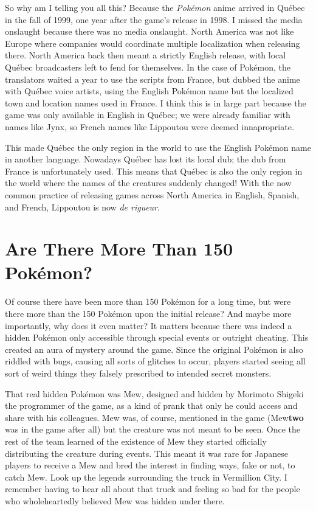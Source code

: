 \documentclass{book}
\begin{document}
So why am I telling you all this? Because the \emph{Pokémon} anime arrived in Québec in the fall of 1999, one year after the game’s release in 1998. I missed the media onslaught because there was no media onslaught. North America was not like Europe where companies would coordinate multiple localization when releasing there. North America back then meant a strictly English release, with local Québec broadcasters left to fend for themselves. In the case of Pokémon, the translators waited a year to use the scripts from France, but dubbed the anime with Québec voice artists, using the English Pokémon name but the localized town and location names used in France. I think this is in large part because the game was only available in English in Québec; we were already familiar with names like Jynx, so French names like Lippoutou were deemed innapropriate.

This made Québec the only region in the world to use the English Pokémon name in another language. Nowadays Québec has lost its local dub; the dub from France is unfortunately used. This means that Québec is also the only region in the world where the names of the creatures suddenly changed! With the now common practice of releasing games across North America in English, Spanish, and French, Lippoutou is now \emph{de rigueur}.

\FloatBarrier\needspace{10mm}\section*{Are There More Than 150 Pokémon?}\nopagebreak[4]

Of course there have been more than 150 Pokémon for a long time, but were there more than the 150 Pokémon upon the initial release? And maybe more importantly, why does it even matter? It matters because there was indeed a hidden Pokémon only accessible through special events or outright cheating. This created an aura of mystery around the game. Since the original Pokémon is also riddled with bugs, causing all sorts of glitches to occur, players started seeing all sort of weird things they falsely prescribed to intended secret monsters.

That real hidden Pokémon was Mew, designed and hidden by Morimoto Shigeki the programmer of the game, as a kind of prank that only he could access and share with his colleagues. Mew was, of course, mentioned in the game (Mew\textbf{two} was in the game after all) but the creature was not meant to be seen. Once the rest of the team learned of the existence of Mew they started officially distributing the creature during events. This meant it was rare for Japanese players to receive a Mew and bred the interest in finding ways, fake or not, to catch Mew. Look up the legends surrounding the truck in Vermillion City. I remember having to hear all about that truck and feeling so bad for the people who wholeheartedly believed Mew was hidden under there.
\end{document}
